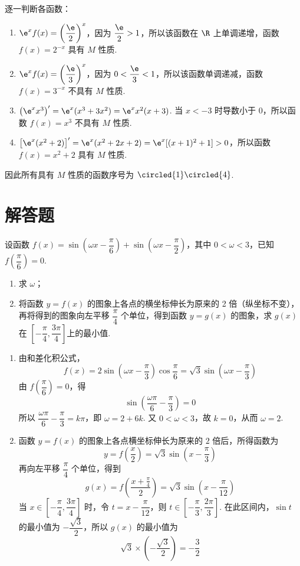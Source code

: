 \begin{solution}
逐一判断各函数：
\begin{enumerate}
\item \(\e^xf(x)=\left(\dfrac\e2\right)^x\)，因为 \(\dfrac\e2>1\)，所以该函数在 \(\R\) 上单调递增，函数 \(f(x)=2^{-x}\) 具有 \(M\) 性质.
\item \(\e^xf(x)=\left(\dfrac\e3\right)^x\)，因为 \(0<\dfrac\e3<1\)，所以该函数单调递减，函数 \(f(x)=3^{-x}\) 不具有 \(M\) 性质.
\item \(\left(\e^xx^3\right)'=\e^x(x^3+3x^2)=\e^xx^2(x+3)\). 当 \(x<-3\) 时导数小于 \(0\)，所以函数 \(f(x)=x^3\) 不具有 \(M\) 性质.
\item \(\left[\e^x(x^2+2)\right]'=\e^x(x^2+2x+2)=\e^x[(x+1)^2+1]>0\)，所以函数 \(f(x)=x^2+2\) 具有 \(M\) 性质.
\end{enumerate}
因此所有具有 \(M\) 性质的函数序号为 \(\circled{1}\circled{4}\).
\end{solution}

\section{解答题}

\begin{problem}
设函数 \(f(x)=\sin\!\left(\omega x-\dfrac{\pi}{6}\right)+\sin\!\left(\omega x-\dfrac{\pi}{2}\right)\)，其中 \(0<\omega<3\)，已知 \(f\!\left(\dfrac{\pi}{6}\right)=0\).

\begin{enumerate}
\item 求 \(\omega\)；
\item 将函数 \(y=f(x)\) 的图象上各点的横坐标伸长为原来的 2 倍（纵坐标不变），再将得到的图象向左平移 \(\dfrac{\pi}{4}\) 个单位，得到函数 \(y=g(x)\) 的图象，求 \(g(x)\) 在 \(\left[-\dfrac{\pi}{4},\dfrac{3\pi}{4}\right]\)上的最小值.
\end{enumerate}
\end{problem}

\begin{solution}
\begin{enumerate}
\item 由和差化积公式，
\[
f(x)=2\sin\left(\omega x-\frac\pi3\right)\cos\frac\pi6=\sqrt3\sin\left(\omega x-\frac\pi3\right)
\]
由 \(f\left(\dfrac\pi6\right)=0\)，得
\[
\sin\left(\frac{\omega\pi}{6}-\frac\pi3\right)=0
\]
所以 \(\dfrac{\omega\pi}{6}-\dfrac\pi3=k\pi\)，即 \(\omega=2+6k\). 又 \(0<\omega<3\)，故 \(k=0\)，从而 \(\omega=2\).
\item 函数 \(y=f(x)\) 的图象上各点横坐标伸长为原来的 \(2\) 倍后，所得函数为
\[
y=f\left(\frac x2\right)=\sqrt3\sin\left(x-\frac\pi3\right)
\]
再向左平移 \(\dfrac\pi4\) 个单位，得到
\[
g(x)=f\left(\frac{x+\frac{\pi}{4}}{2}\right)=\sqrt3\sin\left(x-\frac\pi{12}\right)
\]
当 \(x\in\left[-\dfrac\pi4,\dfrac{3\pi}4\right]\) 时，令 \(t=x-\dfrac\pi{12}\)，则 \(t\in\left[-\dfrac\pi3,\dfrac{2\pi}3\right]\). 在此区间内，\(\sin t\) 的最小值为 \(-\dfrac{\sqrt3}{2}\)，所以 \(g(x)\) 的最小值为
\[
\sqrt3\times\left(-\frac{\sqrt3}{2}\right)=-\frac32
\]
\end{enumerate}
\end{solution}

